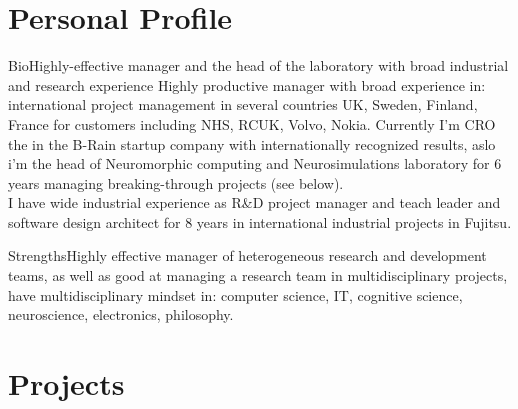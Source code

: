 \documentclass{moderncv}
\begin{document}
%
\makecvtitle

 
\section{Personal Profile}

\cventry
    {Bio}{Highly-effective manager and the head of the laboratory with broad industrial and research experience}{}{}{}
    {Highly productive manager with broad experience in: international project management in several countries UK, Sweden, Finland, France for customers including NHS, RCUK, Volvo, Nokia.
      Currently I'm CRO the in the B-Rain startup company with internationally recognized results, aslo i'm the head of  Neuromorphic computing and Neurosimulations laboratory for 6 years managing breaking-through projects (see below).\\
      I have wide industrial experience as R\&D project manager and teach leader and software design architect for 8 years in international industrial projects in Fujitsu.}

\cvitem
    {Strengths}{\small Highly effective manager of heterogeneous research and development teams, as well as good at managing a research team in multidisciplinary projects, have multidisciplinary mindset in: computer science, IT, cognitive science, neuroscience, electronics, philosophy.}

\section{Projects}
\end{document}
